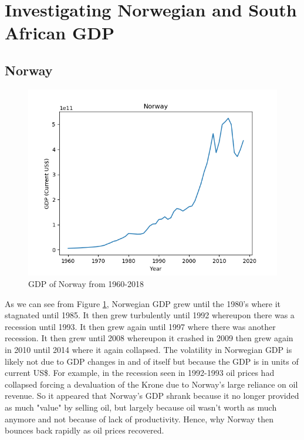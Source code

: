 \documentclass[11pt,a4paper]{CLabBookTemplate} %
\begin{document}
\clearpage
\section{Investigating Norwegian and South African GDP}
\subsection{Norway}

\begin{figure}[h!]
	\centering
	\includegraphics[width = 120mm]{Figures/NorGDP.png}
	\caption{GDP of Norway from 1960-2018}
	\label{fig:NorGDP}
\end{figure}

As we can see from Figure \ref{fig:NorGDP}, Norwegian GDP grew until the 1980's where it stagnated until 1985. It then grew turbulently until 1992 whereupon there was a recession until 1993. It then grew again until 1997 where there was another recession. It then grew until 2008 whereupon it crashed in 2009 then grew again in 2010 until 2014 where it again collapsed. The volatility in Norwegian GDP is likely not due to GDP changes in and of itself but because the GDP is in units of current US\$. For example, in the recession seen in 1992-1993 oil prices had collapsed forcing a devaluation of the Krone due to Norway's large reliance on oil revenue. So it appeared that Norway's GDP shrank because it no longer provided as much "value" by selling oil, but largely because oil wasn't worth as much anymore and not because of lack of productivity. Hence, why Norway then bounces back rapidly as oil prices recovered. 
\end{document}
